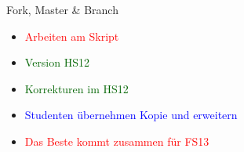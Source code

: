 \begin{frame}
\begin{columns}
\begin{column}{5cm}
            \begin{block}{Fork, Master \& Branch}
                \begin{itemize}
                    \item \textcolor{red}{Arbeiten am Skript}
                    \item \textcolor{darkgreen}{Version HS12}
                    \item \textcolor{darkgreen}{Korrekturen im HS12}
                    \item \textcolor{blue}{Studenten übernehmen Kopie und erweitern}
                    \item \textcolor{red}{Das Beste kommt zusammen für FS13}
                \end{itemize}
            \end{block}
        \end{column}
    \end{columns}
\end{frame}

